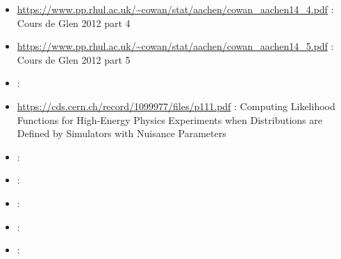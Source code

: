 \begin{itemize}
    \item \url{https://www.pp.rhul.ac.uk/~cowan/stat/aachen/cowan_aachen14_4.pdf} : Cours de Glen 2012 part 4
    \item \url{https://www.pp.rhul.ac.uk/~cowan/stat/aachen/cowan_aachen14_5.pdf} : Cours de Glen 2012 part 5
    \item \url{} : 
    \item \url{https://cds.cern.ch/record/1099977/files/p111.pdf} : Computing Likelihood Functions for High-Energy Physics Experiments when Distributions are Defined by Simulators with Nuisance Parameters
    \item \url{} : 
    \item \url{} : 
    \item \url{} : 
    \item \url{} : 
    \item \url{} : 
\end{itemize}





